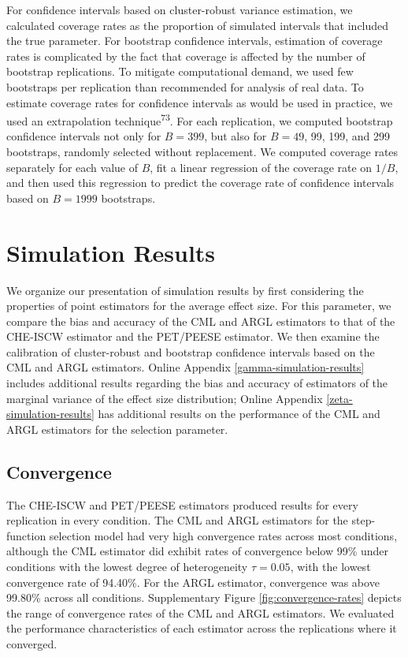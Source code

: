\documentclass[
  man, donotrepeattitle,floatsintext]{apa7}
\begin{document}
For confidence intervals based on cluster-robust variance estimation, we calculated coverage rates as the proportion of simulated intervals that included the true parameter.
For bootstrap confidence intervals, estimation of coverage rates is complicated by the fact that coverage is affected by the number of bootstrap replications.
To mitigate computational demand, we used few bootstraps per replication than recommended for analysis of real data.
To estimate coverage rates for confidence intervals as would be used in practice, we used an extrapolation technique\textsuperscript{73}.
For each replication, we computed bootstrap confidence intervals not only for \(B = 399\), but also for \(B = 49\), 99, 199, and 299 bootstraps, randomly selected without replacement.
We computed coverage rates separately for each value of \(B\), fit a linear regression of the coverage rate on \(1 / B\), and then used this regression to predict the coverage rate of confidence intervals based on \(B = 1999\) bootstraps.

\section{Simulation Results}\label{simulation-results}

We organize our presentation of simulation results by first considering the properties of point estimators for the average effect size.
For this parameter, we compare the bias and accuracy of the CML and ARGL estimators to that of the CHE-ISCW estimator and the PET/PEESE estimator.
We then examine the calibration of cluster-robust and bootstrap confidence intervals based on the CML and ARGL estimators.
Online Appendix \ref{gamma-simulation-results} includes additional results regarding the bias and accuracy of estimators of the marginal variance of the effect size distribution; Online Appendix \ref{zeta-simulation-results} has additional results on the performance of the CML and ARGL estimators for the selection parameter.

\subsection{Convergence}\label{convergence}

The CHE-ISCW and PET/PEESE estimators produced results for every replication in every condition.
The CML and ARGL estimators for the step-function selection model had very high convergence rates across most conditions, although the CML estimator did exhibit rates of convergence below 99\% under conditions with the lowest degree of heterogeneity \(\tau = 0.05\), with the lowest convergence rate of 94.40\%.
For the ARGL estimator, convergence was above 99.80\% across all conditions.
Supplementary Figure \ref{fig:convergence-rates} depicts the range of convergence rates of the CML and ARGL estimators.
We evaluated the performance characteristics of each estimator across the replications where it converged.
\end{document}
